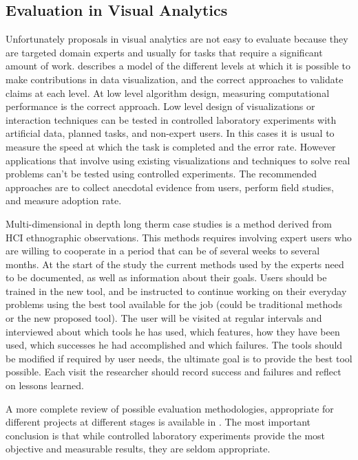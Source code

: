 \subsection{Evaluation in Visual Analytics}

Unfortunately proposals in visual analytics are not easy to evaluate because they are targeted domain experts and usually for tasks that require a significant amount of work. \autocite{munzner_nested_2009} describes a model of the different levels at which it is possible to make contributions in data visualization, and the correct approaches to validate claims at each level. At low level algorithm design, measuring computational performance is the correct approach. Low level design of visualizations or interaction techniques can be tested in controlled laboratory experiments with artificial data, planned tasks, and non-expert users. In this cases it is usual to measure the speed at which the task is completed and the error rate. However applications that involve using existing visualizations and techniques to solve real problems can't be tested using controlled experiments. The recommended approaches are to collect anecdotal evidence from users, perform field studies, and measure adoption rate.  
 
Multi-dimensional in depth long therm case studies \autocite{shneiderman_strategies_2006} is a method derived from HCI ethnographic observations. This methods requires involving expert users who are willing to cooperate in a period that can be of several weeks to several months. At the start of the study the current methods used by the experts need to be documented, as well as information about their goals. Users should be trained in the new tool, and be instructed to continue working on their everyday problems using the best tool available for the job (could be traditional methods or the new proposed tool). The user will be visited at regular intervals and interviewed about which tools he has used, which features, how they have been used, which successes he had accomplished and which failures. The tools should be modified if required by user needs, the ultimate goal is to provide the best tool possible. Each visit the researcher should record success and failures and reflect on lessons learned.

A more complete review of possible evaluation methodologies, appropriate for different projects at different stages is available in \autocite{lam_seven_2011}. The most important conclusion is that while controlled laboratory experiments provide the most objective and measurable results, they are seldom appropriate.


